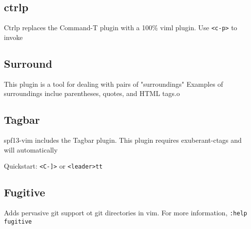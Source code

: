 \documentclass[11pt]{book}
\begin{document}
 \subsection{ctrlp}
 Ctrlp replaces the Command-T plugin with a 100\% viml plugin. Use \verb|<c-p>| 
 to invoke
 \subsection{Surround}
 This plugin is a tool for dealing with pairs of "surroundings" Examples of 
 surroundings inclue parentheses, quotes, and HTML tags.o
 \subsection{Tagbar}
 spf13-vim includes the Tagbar plugin. This plugin requires exuberant-ctags 
 and will automatically 

 Quickstart: \verb|<C-]>| or \verb|<leader>tt|
 \subsection{Fugitive}
 Adds pervasive git support ot git directories in vim. For more information, 
 \verb|:help fugitive|
 
         
\end{document}
